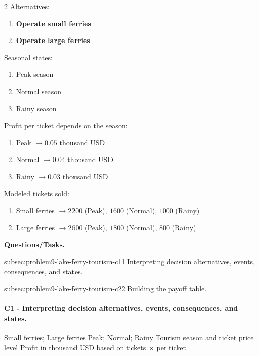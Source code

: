 	\begin{multicols}{2}
		Alternatives:
		\begin{enumerate}[label=\arabic*.]
			\item \textbf{Operate small ferries}
			\item \textbf{Operate large ferries}
		\end{enumerate}

		Seasonal states:
		\begin{enumerate}[label=\arabic*.]
			\item Peak season
			\item Normal season
			\item Rainy season
		\end{enumerate}

			\columnbreak

		Profit per ticket depends on the season:
		\begin{enumerate}[label=\arabic*.]
			\item Peak $\to 0.05$ thousand USD
			\item Normal $\to 0.04$ thousand USD
			\item Rainy $\to 0.03$ thousand USD
		\end{enumerate}

		Modeled tickets sold:
		\begin{enumerate}[label=\arabic*.]
			\item Small ferries $\to 2200$ (Peak), $1600$ (Normal), $1000$ (Rainy)
			\item Large ferries $\to 2600$ (Peak), $1800$ (Normal), $800$ (Rainy)
		\end{enumerate}
	\end{multicols}

	\textbf{Questions/Tasks.}
	\begin{enumerate}
		\CriterionTask
		{subsec:problem9-lake-ferry-tourism-c1}{1}
		{Interpreting decision alternatives, events, consequences, and states.}

		\CriterionTask
		{subsec:problem9-lake-ferry-tourism-c2}{2}
		{Building the payoff table.}
	\end{enumerate}

	\paragraph*{C1 - Interpreting decision alternatives, events, consequences, and states.}
	\label{subsec:problem9-lake-ferry-tourism-c1}
	\DecisionElementsTable
	{Small ferries; Large ferries}
	{Peak; Normal; Rainy}
	{Tourism season and ticket price level}
	{Profit in thousand USD based on tickets $\times$  per ticket}

